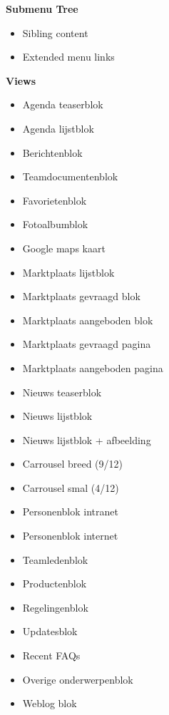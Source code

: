\textbf{Submenu Tree}

\begin{itemize}
\item Sibling content
\item Extended menu links
\end{itemize}

\textbf{Views}

\begin{itemize}
\item Agenda teaserblok
\item Agenda lijstblok
\item Berichtenblok
\item Teamdocumentenblok
\item Favorietenblok
\item Fotoalbumblok
\item Google maps kaart
\item Marktplaats lijstblok
\item Marktplaats gevraagd blok
\item Marktplaats aangeboden blok
\item Marktplaats gevraagd pagina
\item Marktplaats aangeboden pagina
\item Nieuws teaserblok
\item Nieuws lijstblok
\item Nieuws lijstblok + afbeelding
\item Carrousel breed (9/12)
\item Carrousel smal (4/12)
\item Personenblok intranet
\item Personenblok internet
\item Teamledenblok
\item Productenblok
\item Regelingenblok
\item Updatesblok
\item Recent FAQs
\item Overige onderwerpenblok
\item Weblog blok
\end{itemize}